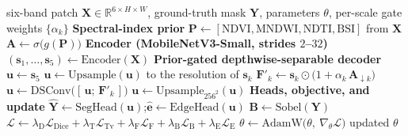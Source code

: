 \documentclass[review]{elsarticle}
\begin{document}
\begin{algorithm}[t]
\caption{SPEAR-Net training step for one mini-batch}
\label{alg:spearnet}
\begin{algorithmic}[1]
\Require six-band patch $\mathbf{X}\in\mathbb{R}^{6\times H\times W}$, ground-truth mask
$\mathbf{Y}$, parameters $\theta$, per-scale gate weights $\{\alpha_k\}$
\Statex \textbf{Spectral-index prior}
\State $\mathbf{P}\gets[\mathrm{NDVI},\mathrm{MNDWI},\mathrm{NDTI},\mathrm{BSI}]$ from $\mathbf{X}$ 
\State $\mathbf{A}\gets\sigma\!\big(g(\mathbf{P})\big)$ 
\Statex \textbf{Encoder (MobileNetV3-Small, strides $2$--$32$)}
\State $(\mathbf{s}_1,\dots,\mathbf{s}_5)\gets\mathrm{Encoder}(\mathbf{X})$
\Statex \textbf{Prior-gated depthwise-separable decoder}
\State $\mathbf{u}\gets\mathbf{s}_5$ 
  \State $\mathbf{u}\gets\mathrm{Upsample}(\mathbf{u})$ to the resolution of $\mathbf{s}_k$
  \State $\mathbf{F}'_k\gets\mathbf{s}_k\odot\big(1+\alpha_k\,\mathbf{A}_{\downarrow k}\big)$ 
  \State $\mathbf{u}\gets\mathrm{DSConv}\big([\,\mathbf{u};\,\mathbf{F}'_k\,]\big)$ 
\EndFor
\State $\mathbf{u}\gets\mathrm{Upsample}_{256^2}(\mathbf{u})$
\Statex \textbf{Heads, objective, and update}
\State $\hat{\mathbf{Y}}\gets\mathrm{SegHead}(\mathbf{u})$;\quad $\hat{\mathbf{e}}\gets\mathrm{EdgeHead}(\mathbf{u})$
\State $\mathbf{B}\gets\mathrm{Sobel}(\mathbf{Y})$ 
\State $\mathcal{L}\gets\lambda_{\mathrm{D}}\mathcal{L}_{\mathrm{Dice}}+\lambda_{\mathrm{T}}\mathcal{L}_{\mathrm{Tv}}+\lambda_{\mathrm{F}}\mathcal{L}_{\mathrm{F}}+\lambda_{\mathrm{B}}\mathcal{L}_{\mathrm{B}}+\lambda_{\mathrm{E}}\mathcal{L}_{\mathrm{E}}$ 
\State $\theta\gets\mathrm{AdamW}\big(\theta,\ \nabla_{\theta}\mathcal{L}\big)$
\State \Return updated $\theta$
\end{algorithmic}
\end{algorithm}
\end{document}
